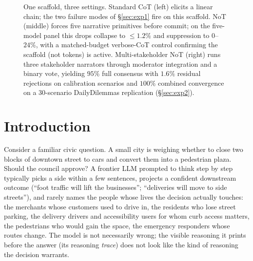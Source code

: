 \documentclass[11pt]{article}
\begin{document}
\begin{figure}[!t]
\begin{tikzpicture}
\end{tikzpicture}
\caption{One scaffold, three settings. Standard CoT (left) elicits a linear chain; the two failure modes of \S\ref{sec:exp1} fire on this scaffold. NoT (middle) forces five narrative primitives before commit; on the five-model panel this drops collapse to ${\leq}1.2\%$ and suppression to $0$--$24\%$, with a matched-budget verbose-CoT control confirming the scaffold (not tokens) is active. Multi-stakeholder NoT (right) runs three stakeholder narrators through moderator integration and a binary vote, yielding $95\%$ full consensus with $1.6\%$ residual rejections on calibration scenarios and $100\%$ combined convergence on a 30-scenario DailyDilemmas replication (\S\ref{sec:exp2}).}
\label{fig:hero}
\end{figure}

\section{Introduction}
\label{sec:intro}

Consider a familiar civic question. A small city is weighing whether
to close two blocks of downtown street to cars and convert them into a
pedestrian plaza. Should the council approve? A frontier LLM prompted
to think step by step typically picks a side within a few sentences,
projects a confident downstream outcome (``foot traffic will lift the
businesses''; ``deliveries will move to side streets''), and rarely
names the people whose lives the decision actually touches: the
merchants whose customers used to drive in, the residents who lose
street parking, the delivery drivers and accessibility users for whom
curb access matters, the pedestrians who would gain the space, the
emergency responders whose routes change. The model is not
necessarily wrong; the visible reasoning it prints before the answer
(its reasoning \emph{trace}) does not look like the kind
of reasoning the decision warrants.
\end{document}
